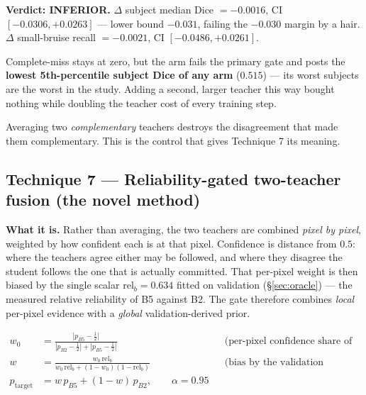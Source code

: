 \documentclass[11pt]{article}
\newcommand{\lose}[1]{\textcolor{losered}{#1}}
\begin{document}
\textbf{Verdict: \lose{INFERIOR}.}
$\Delta$ subject median Dice $=-0.0016$, CI $[-0.0306,+0.0263]$ --- lower bound $-0.031$, failing
the $-0.030$ margin by a hair. $\Delta$ small-bruise recall $=-0.0021$, CI $[-0.0486,+0.0261]$.

Complete-miss stays at zero, but the arm fails the primary gate and posts the \textbf{lowest
5th-percentile subject Dice of any arm} ($0.515$) --- its worst subjects are the worst in the
study. Adding a second, larger teacher this way bought nothing while doubling the teacher cost of
every training step.

\begin{keybox}
Averaging two \emph{complementary} teachers destroys the disagreement that made them
complementary. This is the control that gives Technique 7 its meaning.
\end{keybox}

\subsection{Technique 7 --- Reliability-gated two-teacher fusion (the novel method)}

\textbf{What it is.} Rather than averaging, the two teachers are combined \emph{pixel by pixel},
weighted by how confident each is at that pixel. Confidence is distance from $0.5$: where the
teachers agree either may be followed, and where they disagree the student follows the one that is
actually committed. That per-pixel weight is then biased by the single scalar
$\mathrm{rel}_b=0.634$ fitted on validation (\S\ref{sec:oracle}) --- the measured relative
reliability of B5 against B2. The gate therefore combines \emph{local} per-pixel evidence with a
\emph{global} validation-derived prior.

\begin{align*}
  w_0 &= \frac{|p_{B5}-\tfrac12|}{|p_{B2}-\tfrac12| + |p_{B5}-\tfrac12|}
         &&\text{(per-pixel confidence share of B5)}\\[3pt]
  w   &= \frac{w_0\,\mathrm{rel}_b}{w_0\,\mathrm{rel}_b + (1-w_0)(1-\mathrm{rel}_b)}
         &&\text{(bias by the validation reliability)}\\[3pt]
  p_{\text{target}} &= w\,p_{B5} + (1-w)\,p_{B2}, \qquad \alpha = 0.95
\end{align*}
\end{document}
